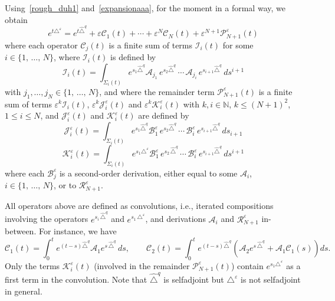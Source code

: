 \documentclass[AHL,Unicode,published]{cedram}
\newcommand*\N{\mathbb{N}}
\newcommand{\calK}{\mathcal{K}}
\newcommand{\calA}{\mathcal{A}}
\newcommand{\calR}{\mathcal{R}}
\newcommand{\calC}{\mathcal{C}}
\newcommand{\calI}{\mathcal{I}}
\newcommand{\calP}{\mathcal{P}}
\newcommand{\calJ}{\mathcal{J}}
\newcommand{\calB}{\mathcal{B}}
\renewcommand{\leq}{\leqslant}
\begin{document}
Using~\eqref{rough_duh1} and~\eqref{expansionaaa}, for the moment in a formal way, we obtain
\begin{equation}\label{rough_duhamel2}
e^{t\triangle^\varepsilon} = e^{t \widehat{\triangle}^{q}} + \varepsilon\calC_1(t) + \cdots + \varepsilon^N \calC_N(t) + \varepsilon^{N+1} \calP_{N+1}^\varepsilon(t)
\end{equation}
where each operator $\calC_j(t)$ is a finite sum of terms $\calI_i(t)$ for some $i\in\{1,\,\ldots,\,N\}$, where $\calI_i(t)$ is defined by
\begin{equation}\label{def_mathcal_Ii}
\calI_i(t) = \int_{\Sigma_i(t)} e^{s_1 \widehat{\triangle}^{q}} \calA_{j_1} \, e^{s_2 \widehat{\triangle}^{q}}\,\cdots\, \calA_{j_i} \, e^{s_{i+1} \widehat{\triangle}^{q}} \, ds^{i+1}
\end{equation}
with $j_1,\ldots,j_N\in\{1,\,\ldots,\,N\}$, and where the remainder term $\calP_{N+1}^\varepsilon(t)$ is a finite sum of terms $\varepsilon^k\calI_i(t)$, $\varepsilon^k\calJ_i^\varepsilon(t)$ and $\varepsilon^k\calK_i^\varepsilon(t)$ with $k,i\in\N$, $k\leq (N+1)^2$, $1\leq i\leq N$, and $\calJ_i^\varepsilon(t)$ and $\calK_i^\varepsilon(t)$ are defined by
\begin{equation}\label{def_mathcal_Jieps}
\calJ_i^\varepsilon(t) = \int_{\Sigma_i(t)} e^{s_1 \widehat{\triangle}^{q}} \calB_{1}^\varepsilon \, e^{s_2 \widehat{\triangle}^{q}}\,\cdots\,\calB_i^\varepsilon \, e^{s_{i+1} \widehat{\triangle}^{q}} \, ds_{i+1}
\end{equation}
\begin{equation}\label{def_mathcal_Kieps}
\calK_i^\varepsilon(t) = \int_{\Sigma_i(t)} e^{s_1 \triangle^\varepsilon} \calB_{1}^\varepsilon \, e^{s_2\,\widehat{\triangle}^{q}}\,\cdots\,\calB_i^\varepsilon \, e^{s_{i+1} \widehat{\triangle}^{q}} \, ds^{i+1}
\end{equation}
where each $\calB_{j}^\varepsilon$ is a second-order derivation, either equal to some $\calA_i$, $i\in\{1,\,\ldots,\,N\}$, or to $\calR_{N+1}^\varepsilon$.

All operators above are defined as convolutions, i.e., iterated compositions involving the operators $e^{s_i\,\widehat{\triangle}^{q}}$ and $e^{s_1\,\triangle^\varepsilon}$, and derivations $\calA_i$ and $\calR_{N+1}^\varepsilon$ in-between. For instance, we have
\[
\calC_1(t) = \int_0^t e^{(t-s)\widehat{\triangle}^{q}} \calA_1 e^{s\,\widehat{\triangle}^{q}}\, ds,
\qquad
\calC_2(t) = \int_0^t e^{(t-s)\widehat{\triangle}^{q}} \left(\calA_2 e^{s\,\widehat{\triangle}^{q}} + \calA_1 \calC_1(s) \right) ds.
\]
Only the terms $\calK_i^\varepsilon(t)$ (involved in the remainder $\calP_{N+1}^\varepsilon(t)$) contain $e^{s_1 \triangle^\varepsilon}$ as a first term in the convolution. Note that $\widehat{\triangle}^{q}$ is selfadjoint but $\triangle^\varepsilon$ is not selfadjoint in general.
\end{document}
